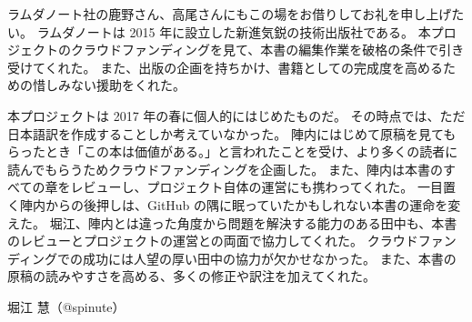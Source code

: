 ラムダノート社の鹿野さん、高尾さんにもこの場をお借りしてお礼を申し上げたい。
ラムダノートは 2015 年に設立した新進気鋭の技術出版社である。
本プロジェクトのクラウドファンディングを見て、本書の編集作業を破格の条件で引き受けてくれた。
また、出版の企画を持ちかけ、書籍としての完成度を高めるための惜しみない援助をくれた。

本プロジェクトは 2017 年の春に個人的にはじめたものだ。
その時点では、ただ日本語訳を作成することしか考えていなかった。
陣内にはじめて原稿を見てもらったとき「この本は価値がある。」と言われたことを受け、より多くの読者に読んでもらうためクラウドファンディングを企画した。
また、陣内は本書のすべての章をレビューし、プロジェクト自体の運営にも携わってくれた。
一目置く陣内からの後押しは、GitHub の隅に眠っていたかもしれない本書の運命を変えた。
堀江、陣内とは違った角度から問題を解決する能力のある田中も、本書のレビューとプロジェクトの運営との両面で協力してくれた。
クラウドファンディングでの成功には人望の厚い田中の協力が欠かせなかった。
また、本書の原稿の読みやすさを高める、多くの修正や訳注を加えてくれた。

堀江 慧（@spinute）
